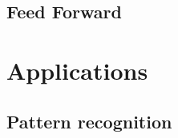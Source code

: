 \documentclass[10pt,a4paper,DIV=11]{scrreprt}
\begin{document}
\subsection{Feed Forward}
\section{Applications}
\subsection{Pattern recognition}


\newpage


\listoffigures
\listoftables
\listofalgorithms
\lstlistoflistings

\newpage




\end{document}
